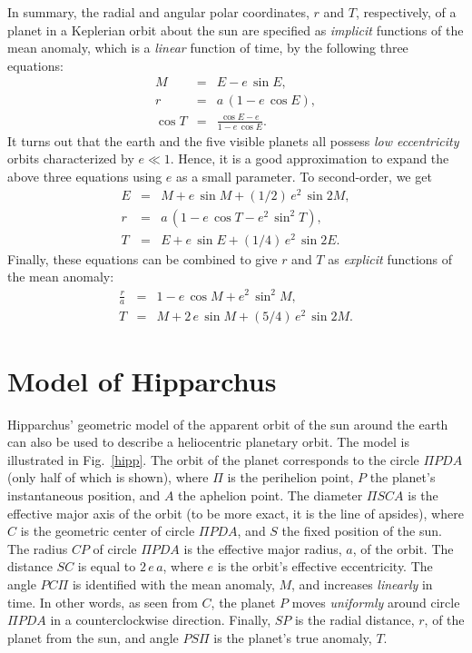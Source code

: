 In summary, the radial and angular polar coordinates, $r$ and $T$, respectively,
of a planet in a Keplerian orbit about the sun are specified as {\em implicit}\/ functions
of the mean anomaly, which is a {\em linear}\/ function of time, by the
following three equations:
\begin{eqnarray}
M &=& E - e\,\sin E,\\[0.5ex]
r &=& a\,(1- e\,\cos E),\\[0.5ex]
\cos T &=& \frac{\cos E - e}{1-e\,\cos E}.
\end{eqnarray}
It turns out that the earth and the five visible planets all possess {\em low eccentricity}\/ orbits characterized by $e\ll 1$. Hence, it is a good approximation to expand the above three equations
using $e$ as a small parameter. To second-order, we
get
\begin{eqnarray}
E &=& M + e\,\sin M + (1/2)\,e^2\,\sin 2M,\\[0.5ex]
r& =& a\,(1-e\,\cos T - e^2\,\sin^2 T),\\[0.5ex]
T &=& E + e\,\sin E + (1/4)\,e^2\,\sin 2 E.
\end{eqnarray}
Finally, these equations can be combined to give $r$ and $T$ as {\em explicit}\/ functions of the
mean anomaly:
\begin{eqnarray}
\frac{r}{a} &=& 1 -e\,\cos M + e^2\,\sin^2 M,\label{je22}\\[0.5ex]
T &=& M + 2\,e\,\sin M + (5/4)\,e^2\,\sin 2M.\label{je23}
\end{eqnarray}

\section{Model of Hipparchus}
Hipparchus' geometric model of the apparent orbit of the sun around the earth can also be used to describe a heliocentric planetary orbit. The model is illustrated  in Fig.~\ref{hipp}. The orbit of the planet corresponds
to the circle $\Pi P D A$ (only half of which is shown), where $\Pi$ is the perihelion point, $P$ the planet's instantaneous position,
and $A$ the aphelion point. The diameter $\Pi   S C A$ is the effective major axis of the orbit (to be more exact, it
is the line of apsides), where $C$ is the geometric center of circle $\Pi P D A$, and $S$ the fixed position of the sun.
The radius $CP$ of circle $\Pi PDA$ is   the effective major radius, $a$, of the orbit.  The distance $SC$ is
equal to $2\,e\,a$, where $e$ is the orbit's effective eccentricity. The angle $PC\Pi$
is  identified with the  mean anomaly, $M$, and increases {\em linearly}\/  in time.  In other words, as seen from $C$, the planet
$P$ moves {\em uniformly}\/ around circle $\Pi PDA$ in a counterclockwise direction. Finally, $SP$ is the radial
distance, $r$, of the planet from the sun, and angle $P S \Pi$ is the planet's true anomaly, $T$.

